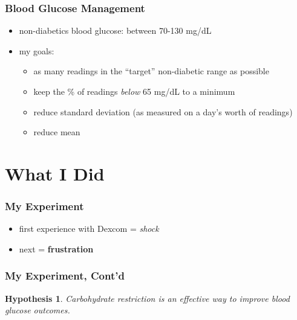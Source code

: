 \documentclass{beamer}
\newtheorem{hypothesis}{Hypothesis}
\begin{document}
\begin{frame}
  \frametitle{Blood Glucose Management}

  \begin{itemize}
  \item non-diabetics blood glucose: between 70-130 mg/dL
  \pause
  \item my goals:
  \pause
    \begin{itemize}
    \item as many readings in the ``target'' non-diabetic range as possible
    \pause
    \item keep the \% of readings \textit{below} 65 mg/dL to a minimum
    \pause
    \item reduce standard deviation (as measured on a day's worth of readings)
    \pause
    \item reduce mean
    \end{itemize}
  \end{itemize}

\end{frame}

\section{What I Did}

\begin{frame}
  \frametitle{My Experiment}

  \begin{itemize}
  \item first experience with Dexcom \pause = \textit{shock}
  \pause
  \item next \pause = \textbf{frustration}
  \end{itemize}
  
\end{frame}

\begin{frame}
  \frametitle{My Experiment, Cont'd}

  \begin{hypothesis}
    Carbohydrate restriction is an effective way to improve blood glucose outcomes.
  \end{hypothesis}

\end{frame}
\end{document}
